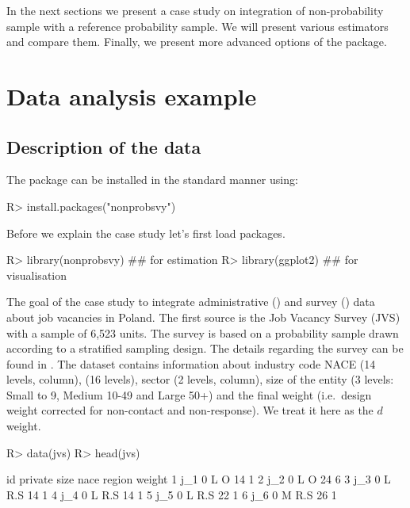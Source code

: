 \documentclass[
]{jss}
\begin{document}
In the next sections we present a case study on integration of
non-probability sample with a reference probability sample. We will
present various estimators and compare them. Finally, we present more
advanced options of the package.

\section{Data analysis example}\label{sec-data-analysis}

\subsection{Description of the data}\label{description-of-the-data}

The package can be installed in the standard manner using:

\begin{CodeChunk}
\begin{CodeInput}
R> install.packages("nonprobsvy")
\end{CodeInput}
\end{CodeChunk}

Before we explain the case study let's first load packages.

\begin{CodeChunk}
\begin{CodeInput}
R> library(nonprobsvy) ## for estimation
R> library(ggplot2) ## for visualisation
\end{CodeInput}
\end{CodeChunk}

The goal of the case study to integrate administrative ()
and survey () data about job vacancies in Poland. The first
source is the Job Vacancy Survey (JVS) with a sample of 6,523 units. The
survey is based on a probability sample drawn according to a stratified
sampling design. The details regarding the survey can be found in
\cite{jvs2022}. The dataset contains information about industry code
NACE (14 levels,  column),  (16 levels), sector
(2 levels,  column), size of the entity (3 levels: Small
to 9, Medium 10-49 and Large 50+) and the final weight (i.e.~design
weight corrected for non-contact and non-response). We treat it here as
the \(d\) weight.

\begin{CodeChunk}
\begin{CodeInput}
R> data(jvs)
R> head(jvs)
\end{CodeInput}
\begin{CodeOutput}
   id private size nace region weight
1 j_1       0    L    O     14      1
2 j_2       0    L    O     24      6
3 j_3       0    L  R.S     14      1
4 j_4       0    L  R.S     14      1
5 j_5       0    L  R.S     22      1
6 j_6       0    M  R.S     26      1
\end{CodeOutput}
\end{CodeChunk}
\end{document}
